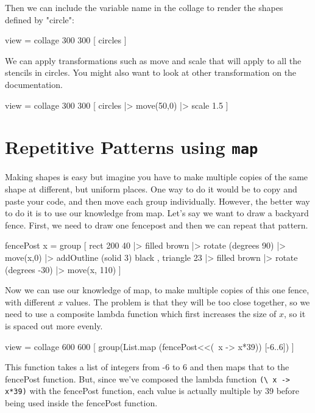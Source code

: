 \documentclass[12pt]{amsbook}
\begin{document}
Then we can include the variable name in the collage to render the shapes defined by "circle":
\begin{code}
view = collage 300 300 [
						circles
  					   ]
\end{code}

We can apply transformations such as move and scale that will apply to all the stencils in circles. You might also want to look at other transformation on the documentation.
\begin{code}
view = collage 300 300 [
						circles
	 					 |> move(50,0)
    					 |> scale 1.5
    				   ]
\end{code}

\section{Repetitive Patterns using \texttt{map} }

Making shapes is easy but imagine you have to make multiple copies of the same shape at different, but uniform places. One way to do it would be to copy and paste your code, and then move each group individually. However, the better way to do it is to use our knowledge from map. Let's say we want to draw a backyard fence. First, we need to draw one fencepost and then we can repeat that pattern.
	
\begin{code}
fencePost x = group [
	               		rect 200 40
	                	    |> filled brown
	                	    |> rotate (degrees 90)
	                	    |> move(x,0)
	                	    |> addOutline (solid 3) black
	                ,	triangle 23
	                   	 	|> filled brown
	                   		|> rotate (degrees -30)
	                  		|> move(x, 110)
	             	] 
\end{code}
	
				
Now we can use our knowledge of map, to make multiple copies of this one fence, with different $x$ values. The problem is that they will be too close together, so we need to use a composite lambda function which first increases the size of $x$, so it is spaced out more evenly. 

\begin{code}
view = collage 600 600 [
                        	group(List.map (fencePost<<(\ x -> x*39)) [-6..6])
                       ]
\end{code}

This function takes a list of integers from -6 to 6 and then maps that to the fencePost function. But, since we've composed the lambda function \verb|(\ x -> x*39)| with the fencePost function, each value is actually multiple by 39 before being used inside the fencePost function.
\end{document}

